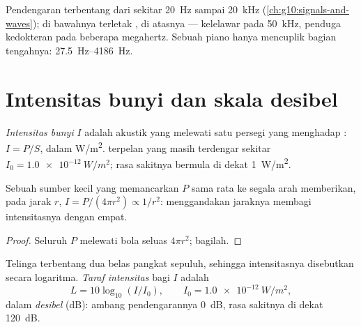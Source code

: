 \begin{remark}\label{rem:g12:sound-acoustics:audible}
Pendengaran terbentang dari sekitar \qty{20}{Hz} sampai \qty{20}{kHz}
(\cref{ch:g10:signals-and-waves}); di bawahnya terletak , di
atasnya  --- kelelawar pada \qty{50}{kHz}, penduga kedokteran
pada beberapa megahertz. Sebuah piano hanya mencuplik bagian tengahnya:
\qtyrange{27.5}{4186}{Hz}.
\end{remark}

\section{Intensitas bunyi dan skala desibel}

\begin{definition}\label{def:g12:sound-acoustics:intensity}
\emph{Intensitas bunyi} $I$ adalah  akustik
yang melewati satu  persegi yang menghadap :
$I = P/S$, dalam \unit{W/m^2}.  terpelan yang masih terdengar
sekitar $I_0 = \qty{1.0e-12}{W/m^2}$; rasa sakitnya bermula di dekat
\qty{1}{W/m^2}.
\end{definition}

\begin{proposition}\label{prop:g12:sound-acoustics:inverse-square}
%
Sebuah sumber kecil yang memancarkan  $P$ sama rata ke segala arah
memberikan, pada jarak $r$, $I = P/(4\pi r^2) \propto 1/r^2$:
menggandakan jaraknya membagi intensitasnya dengan empat.
\end{proposition}

\begin{proof}
Seluruh  $P$ melewati bola seluas $4\pi r^2$; bagilah.
\end{proof}

\begin{definition}\label{def:g12:sound-acoustics:level}
Telinga terbentang dua belas pangkat sepuluh, sehingga intensitasnya
disebutkan secara logaritma. \emph{Taraf intensitas} bagi $I$ adalah
\[ L = 10 \log_{10}(I/I_0), \qquad I_0 = \qty{1.0e-12}{W/m^2}, \]
dalam \emph{desibel} (\unit{dB}): ambang pendengarannya
\qty{0}{dB}, rasa sakitnya di dekat \qty{120}{dB}.
\end{definition}

